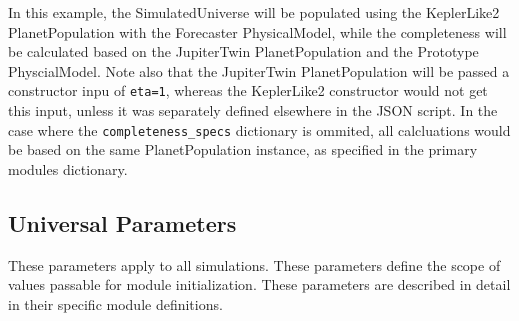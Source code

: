 \documentclass[cleanfoot]{asme2ej}
\begin{document}
In this example, the SimulatedUniverse will be populated using the KeplerLike2 PlanetPopulation with the Forecaster PhysicalModel, while the completeness will be calculated based on the JupiterTwin PlanetPopulation and the Prototype PhyscialModel.  Note also that the JupiterTwin PlanetPopulation will be passed a constructor inpu of \verb+eta=1+, whereas the KeplerLike2 constructor would not get this input, unless it was separately defined elsewhere in the JSON script.  In the case where the \verb+completeness_specs+ dictionary is ommited, all calcluations would be based on the same PlanetPopulation instance, as specified in the primary modules dictionary.


\subsection{Universal Parameters}
These parameters apply to all simulations. These parameters define the scope of values passable for module initialization. These parameters are described in detail in their specific module definitions.
\end{document}
